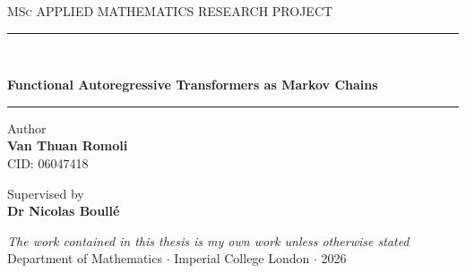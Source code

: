 \documentclass[a4paper,10pt,reqno]{amsart}
\theoremstyle{myplain}
\theoremstyle{mydefinition}
\theoremstyle{myremark}
\newlength{\logowidth}
\newlength{\logopad}
\begin{document}
\begin{titlepage}

    \begin{center}
        \vspace*{\fill}

        {\large \scshape{MSc APPLIED MATHEMATICS RESEARCH PROJECT}}\\[0.8cm]

        \rule{\linewidth}{0.5mm}\\[0.4cm]

        {\LARGE\bfseries
        Functional Autoregressive Transformers as Markov Chains\par}

        \rule{\linewidth}{0.5mm}

        \vskip 2.5cm

        Author\\[3mm]
        {\large\bfseries Van Thuan Romoli}\\[1mm]
        {\normalsize CID: 06047418}

        \vskip 1.5cm

        Supervised by\\[3mm]
        {\large\bfseries Dr Nicolas Boullé}

        \vspace*{\fill}

        {\small\textit{The work contained in this thesis is my own work unless otherwise stated}}\\[-0.5mm]
        {\small
        Department of Mathematics
        $\cdot$
        Imperial College London
        $\cdot$
        2026}
    \end{center}
\end{titlepage}

\makeatletter
\def\l@section{\@tocline{1}{-2pt}{1pc}{1.5pc}{\bfseries}}
\def\l@subsection{\@tocline{2}{-4pt}{2.5pc}{2pc}{}}
\makeatother

\end{document}
